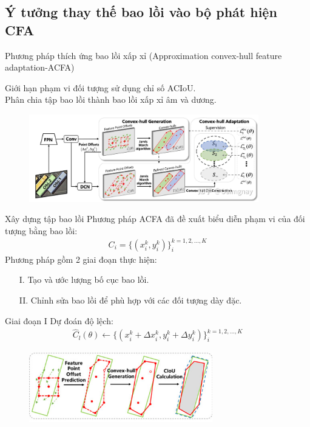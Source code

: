 \documentclass[11pt]{beamer}
\theoremstyle{definition}
\theoremstyle{plain}
\theoremstyle{plain}
\theoremstyle{remark}
\begin{document}
	\subsection{Ý tưởng thay thế bao lồi vào bộ phát hiện CFA}
	\begin{frame}{Phương pháp thích ứng bao lồi xấp xỉ (Approximation convex-hull feature adaptation-ACFA)}
	 
	 Giới hạn phạm vi đối tượng sử dụng chỉ số ACIoU.\\
	 Phân chia tập bao lồi thành bao lồi xấp xỉ âm và dương.
		\begin{figure}[htp]
			\begin{center}
				\includegraphics[width=10cm]{./Hinh_1.jpg}
			\end{center}
		\end{figure}
	\end{frame}
	\begin{frame}{Xây dựng tập bao lồi}
		Phương pháp ACFA đã đề xuất biểu diễn phạm
		vi của đối tượng bằng bao lồi:\\
		\begin{align} \label{ptdd}
			C_i = \{(x_i^k, y_i^k )\}_i^{k=1,2,...,K}
		\end{align}
		Phương pháp gồm 2 giai đoạn thực hiện:
			\begin{itemize}
			\item[I.] Tạo và ước lượng bố cục bao lồi.
			\item[II.] Chỉnh sửa bao lồi để phù hợp với các đối tượng dày đặc.
		\end{itemize}	
	\end{frame}
\begin{frame}{Giai đoạn I}
	Dự đoán độ lệch:
	\begin{align} \label{ptdd}
		\widehat C_l (\theta) \gets \{(x_i^k + \Delta x_i^k, y_i^k + \Delta y_i^k )\}_i^{k=1,2,...,K}
	\end{align}
\begin{figure}[ht!]
	\begin{center}
		\includegraphics[width=8cm]{./feature_point_offset_prediction.jpg}
	\end{center}
\end{figure}
\end{frame}
\end{document}
